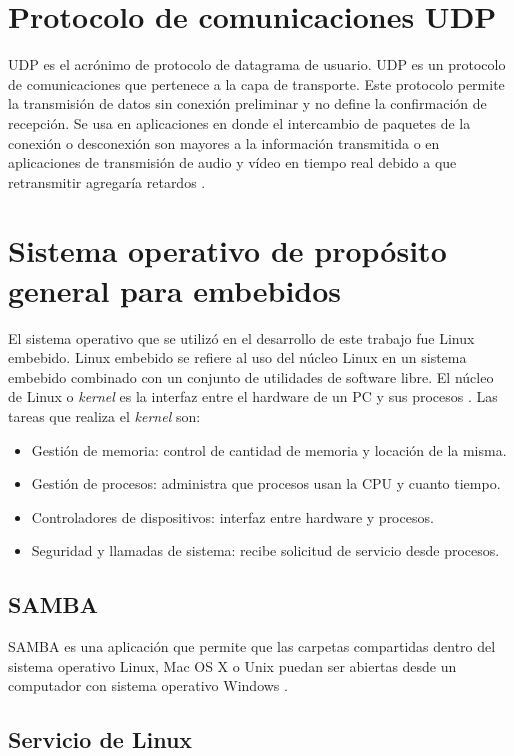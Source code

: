 \section{Protocolo de comunicaciones UDP}
UDP es el acrónimo de protocolo de datagrama de usuario. UDP es un protocolo de comunicaciones que pertenece a la capa de transporte. Este protocolo permite la transmisión de datos sin conexión preliminar y no define la confirmación de recepción. Se usa en aplicaciones en donde el intercambio de paquetes de la conexión o desconexión son mayores a la información transmitida o en aplicaciones de transmisión de audio y vídeo en tiempo real debido a que retransmitir agregaría retardos \citep{WIKIUDP}.


\section{Sistema operativo de propósito general para embebidos}

El sistema operativo que se utilizó en el desarrollo de este trabajo fue Linux embebido. Linux embebido se refiere al uso del núcleo Linux  en un sistema embebido combinado con un conjunto de utilidades de software libre. 
El núcleo de Linux o \textit{kernel} es la interfaz entre el hardware de un PC y sus procesos \citep{KERNEL}. Las tareas que realiza el \textit{kernel} son:

\begin{itemize}
\item Gestión de memoria: control de cantidad de memoria y locación de la misma.
\item Gestión de procesos: administra que procesos usan la CPU y cuanto tiempo.
\item Controladores de dispositivos: interfaz entre hardware y procesos.
\item Seguridad y llamadas de sistema: recibe solicitud de servicio desde procesos. 
\end{itemize}


\subsection{SAMBA}
SAMBA es una aplicación que permite que las carpetas compartidas dentro del sistema operativo Linux, Mac OS X o Unix  puedan ser abiertas desde un computador con sistema operativo Windows \citep{WIKISAMBA}.

\subsection{Servicio de Linux}

